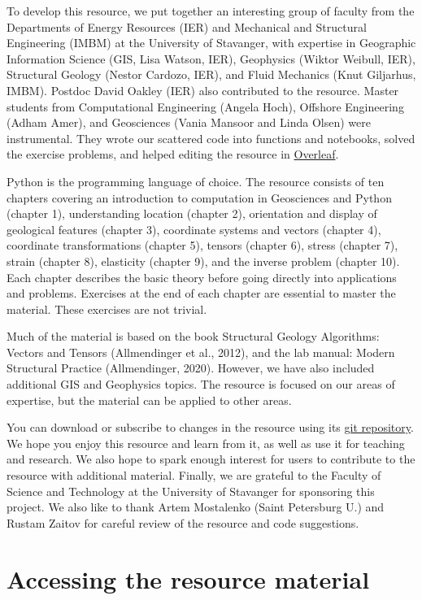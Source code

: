 \documentclass[a4paper , 12pt]{book}
\begin{document}
To develop this resource, we put together an interesting group of faculty from the Departments of Energy Resources (IER) and Mechanical and Structural Engineering (IMBM) at the University of Stavanger, with expertise in Geographic Information Science (GIS, Lisa Watson, IER), Geophysics (Wiktor Weibull, IER), Structural Geology (Nestor Cardozo, IER), and Fluid Mechanics (Knut Giljarhus, IMBM). Postdoc David Oakley (IER) also contributed to the resource. Master students from Computational Engineering (Angela Hoch), Offshore Engineering (Adham Amer), and Geosciences (Vania Mansoor and Linda Olsen) were instrumental. They wrote our scattered code into functions and notebooks, solved the exercise problems, and helped editing the resource in \href {https://www.overleaf.com}{Overleaf}. 

Python is the programming language of choice. The resource consists of ten chapters covering an introduction to computation in Geosciences and Python (chapter 1), understanding location (chapter 2), orientation and display of geological features (chapter 3), coordinate systems and vectors (chapter 4), coordinate transformations (chapter 5), tensors (chapter 6), stress (chapter 7), strain (chapter 8), elasticity (chapter 9), and the inverse problem (chapter 10). Each chapter describes the basic theory before going directly into applications and problems. Exercises at the end of each chapter are essential to master the material. These exercises are not trivial.

Much of the material is based on the book Structural Geology Algorithms: Vectors and Tensors (Allmendinger et al., 2012), and the lab manual: Modern Structural Practice (Allmendinger, 2020). However, we have also included additional GIS and Geophysics topics. The resource is focused on our areas of expertise, but the material can be applied to other areas.

You can download or subscribe to changes in the resource using its \href{https://github.com/nfcd/compGeo}{git repository}. We hope you enjoy this resource and learn from it, as well as use it for teaching and research. We also hope to spark enough interest for users to contribute to the resource with additional material. Finally, we are grateful to the Faculty of Science and Technology at the University of Stavanger for sponsoring this project. We also like to thank Artem Mostalenko (Saint Petersburg U.) and Rustam Zaitov for careful review of the resource and code suggestions.

\section*{Accessing the resource material}
\end{document}
